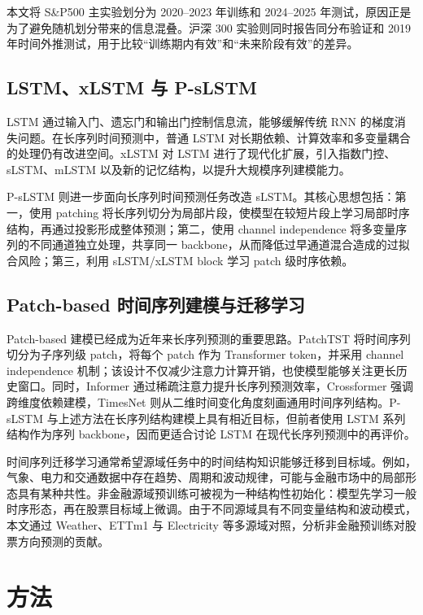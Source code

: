 \documentclass[UTF8,a4paper,twocolumn]{ctexart}
\begin{document}
本文将 S\&P500 主实验划分为 2020--2023 年训练和 2024--2025 年测试，原因正是为了避免随机划分带来的信息混叠。沪深 300 实验则同时报告同分布验证和 2019 年时间外推测试，用于比较“训练期内有效”和“未来阶段有效”的差异。

\subsection{LSTM、xLSTM 与 P-sLSTM}

LSTM 通过输入门、遗忘门和输出门控制信息流，能够缓解传统 RNN 的梯度消失问题\cite{hochreiter1997lstm}。在长序列时间预测中，普通 LSTM 对长期依赖、计算效率和多变量耦合的处理仍有改进空间。xLSTM 对 LSTM 进行了现代化扩展，引入指数门控、sLSTM、mLSTM 以及新的记忆结构，以提升大规模序列建模能力\cite{beck2024xlstm}。

P-sLSTM 则进一步面向长序列时间预测任务改造 sLSTM。其核心思想包括：第一，使用 patching 将长序列切分为局部片段，使模型在较短片段上学习局部时序结构，再通过投影形成整体预测；第二，使用 channel independence 将多变量序列的不同通道独立处理，共享同一 backbone，从而降低过早通道混合造成的过拟合风险；第三，利用 sLSTM/xLSTM block 学习 patch 级时序依赖\cite{kong2025pslstm}。

\subsection{Patch-based 时间序列建模与迁移学习}

Patch-based 建模已经成为近年来长序列预测的重要思路。PatchTST 将时间序列切分为子序列级 patch，将每个 patch 作为 Transformer token，并采用 channel independence 机制；该设计不仅减少注意力计算开销，也使模型能够关注更长历史窗口\cite{nie2023patchtst}。同时，Informer 通过稀疏注意力提升长序列预测效率，Crossformer 强调跨维度依赖建模，TimesNet 则从二维时间变化角度刻画通用时间序列结构\cite{zhou2021informer,zhang2023crossformer,wu2023timesnet}。P-sLSTM 与上述方法在长序列结构建模上具有相近目标，但前者使用 LSTM 系列结构作为序列 backbone，因而更适合讨论 LSTM 在现代长序列预测中的再评价。

时间序列迁移学习通常希望源域任务中的时间结构知识能够迁移到目标域。例如，气象、电力和交通数据中存在趋势、周期和波动规律，可能与金融市场中的局部形态具有某种共性。非金融源域预训练可被视为一种结构性初始化：模型先学习一般时序形态，再在股票目标域上微调。由于不同源域具有不同变量结构和波动模式，本文通过 Weather、ETTm1 与 Electricity 等多源域对照，分析非金融预训练对股票方向预测的贡献。

\section{方法}
\end{document}
